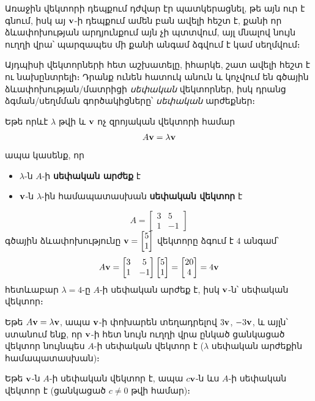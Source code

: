 
Առաջին վեկտորի դեպքում դժվար էր պատկերացնել, թե այն ուր է գնում, իսկ այ $\mathbf{v}$-ի դեպքում ամեն բան ավելի հեշտ է, քանի որ ձևափոխության արդյունքում այն չի պտտվում, այլ մնալով նույն ուղղի վրա՝ պարզապես մի քանի անգամ ձգվում է կամ սեղմվում։ 

Այդպիսի վեկտորների հետ աշխատելը, իհարկե, շատ ավելի հեշտ է ու նախընտրելի։ Դրանք ունեն հատուկ անուն և կոչվում են գծային ձևափոխության/մատրիցի \textit{սեփական} վեկտորներ, իսկ դրանց ձգման/\linebreak սեղմման գործակիցները՝ \textit{սեփական} արժեքներ։

\begin{definition}
Եթե որևէ $\lambda$ թվի և $\mathbf{v}$ ոչ զրոյական վեկտորի համար
\[
A\mathbf{v}=\lambda\mathbf{v}
\]
ապա կասենք, որ 
\begin{itemize}
    \item $\lambda$-ն $A$-ի \textbf{սեփական արժեք} է
    \item $\mathbf{v}$-ն $\lambda$-ին համապատասխան \textbf{սեփական վեկտոր} է
\end{itemize}
\end{definition}


\begin{example}
\[
A = \begin{bmatrix}
 3 & 5 \\ 1 & -1   
\end{bmatrix}
\]
գծային ձևափոխությունը  $\mathbf{v} = \begin{bmatrix}
5 \\ 1
\end{bmatrix}$ վեկտորը ձգում է $4$ անգամ՝
\[A\mathbf{v} =  
\begin{bmatrix}
3 & 5 \\ 1 & -1 
\end{bmatrix}
\begin{bmatrix}
5 \\ 1
\end{bmatrix}
=
\begin{bmatrix}
20 \\ 4
\end{bmatrix}
=4\mathbf{v}
\]
հետևաբար $\lambda = 4$-ը $A$-ի սեփական արժեք է, իսկ $\mathbf{v}$-ն՝ սեփական վեկտոր։ 
\end{example}

Եթե $A\mathbf{v}=\lambda \mathbf{v}$, ապա $\mathbf{v}$-ի փոխարեն տեղադրելով $3\mathbf{v}$, $-3\mathbf{v}$, և այլն՝ ստանում ենք, որ $\mathbf{v}$-ի հետ նույն ուղղի վրա ընկած ցանկացած վեկտոր նույնպես $A$-ի սեփական վեկտոր է ($\lambda$ սեփական արժեքին համապատասխան)։ 
\begin{theorem}
Եթե $\mathbf{v}$-ն $A$-ի սեփական վեկտոր է, ապա $c\mathbf{v}$-ն ևս $A$-ի սեփական վեկտոր է (ցանկացած $c\ne 0$ թվի համար)։
\end{theorem}

